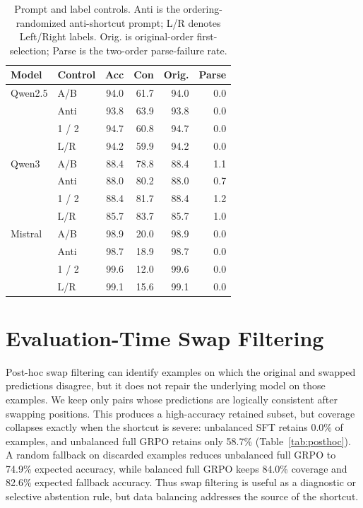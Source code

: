 \documentclass[letterpaper]{article}
\newcommand{\multirow}[3]{#3}
\begin{document}
\begin{table}[htbp]
\centering
\scriptsize
\setlength{\tabcolsep}{3pt}
\begin{tabular}{@{}llrrrr@{}}
\toprule
\textbf{Model} & \textbf{Control} & \textbf{Acc} & \textbf{Con} & \textbf{Orig.} & \textbf{Parse} \\
\midrule
\multirow{4}{*}{Qwen2.5} & A/B & 94.0 & 61.7 & 94.0 & 0.0 \\
& Anti & 93.8 & 63.9 & 93.8 & 0.0 \\
& 1 / 2 & 94.7 & 60.8 & 94.7 & 0.0 \\
& L/R & 94.2 & 59.9 & 94.2 & 0.0 \\
\midrule
\multirow{4}{*}{Qwen3} & A/B & 88.4 & 78.8 & 88.4 & 1.1 \\
& Anti & 88.0 & 80.2 & 88.0 & 0.7 \\
& 1 / 2 & 88.4 & 81.7 & 88.4 & 1.2 \\
& L/R & 85.7 & 83.7 & 85.7 & 1.0 \\
\midrule
\multirow{4}{*}{Mistral} & A/B & 98.9 & 20.0 & 98.9 & 0.0 \\
& Anti & 98.7 & 18.9 & 98.7 & 0.0 \\
& 1 / 2 & 99.6 & 12.0 & 99.6 & 0.0 \\
& L/R & 99.1 & 15.6 & 99.1 & 0.0 \\
\bottomrule
\end{tabular}
\caption{Prompt and label controls. Anti is the ordering-randomized anti-shortcut prompt; L/R denotes Left/Right labels. Orig. is original-order first-selection; Parse is the two-order parse-failure rate.}
\label{tab:labels}
\end{table}

\section{Evaluation-Time Swap Filtering}
\label{app:posthoc}

Post-hoc swap filtering can identify examples on which the original and swapped predictions disagree, but it does not repair the underlying model on those examples. We keep only pairs whose predictions are logically consistent after swapping positions. This produces a high-accuracy retained subset, but coverage collapses exactly when the shortcut is severe: unbalanced SFT retains 0.0\% of examples, and unbalanced full GRPO retains only 58.7\% (Table~\ref{tab:posthoc}). A random fallback on discarded examples reduces unbalanced full GRPO to 74.9\% expected accuracy, while balanced full GRPO keeps 84.0\% coverage and 82.6\% expected fallback accuracy. Thus swap filtering is useful as a diagnostic or selective abstention rule, but data balancing addresses the source of the shortcut.
\end{document}
